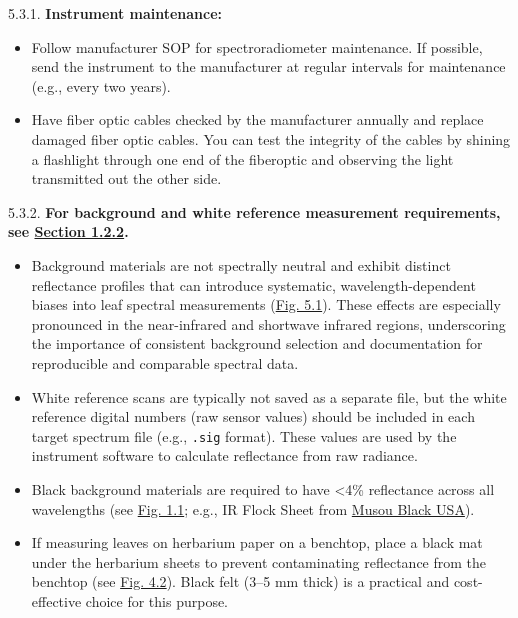 \documentclass[
  letterpaper,
  DIV=11,
  numbers=noendperiod]{scrreprt}
\providecommand{\tightlist}{%
  \setlength{\itemsep}{0pt}\setlength{\parskip}{0pt}}
\begin{document}
5.3.1. \textbf{Instrument maintenance:}

\begin{itemize}
\tightlist
\item
  Follow manufacturer SOP for spectroradiometer maintenance. If
  possible, send the instrument to the manufacturer at regular intervals
  for maintenance (e.g., every two years).\\
\item
  Have fiber optic cables checked by the manufacturer annually and
  replace damaged fiber optic cables. You can test the integrity of the
  cables by shining a flashlight through one end of the fiberoptic and
  observing the light transmitted out the other side.
\end{itemize}

5.3.2. \textbf{For background and white reference measurement
requirements, see
\hyperref[white-reference-and-background-measurements]{Section 1.2.2}.}

\begin{itemize}
\tightlist
\item
  Background materials are not spectrally neutral and exhibit distinct
  reflectance profiles that can introduce systematic,
  wavelength-dependent biases into leaf spectral measurements
  (\href{images/Fig-backgrounds_v2.jpg}{Fig. 5.1}). These effects are
  especially pronounced in the near-infrared and shortwave infrared
  regions, underscoring the importance of consistent background
  selection and documentation for reproducible and comparable spectral
  data.
\item
  White reference scans are typically not saved as a separate file, but
  the white reference digital numbers (raw sensor values) should be
  included in each target spectrum file (e.g., \texttt{.sig} format).
  These values are used by the instrument software to calculate
  reflectance from raw radiance.\\
\item
  Black background materials are required to have \textless4\%
  reflectance across all wavelengths (see \hyperref[f1-1]{Fig. 1.1};
  e.g., IR Flock Sheet from
  \href{https://musoublackusa.com/products/ir-flock-sheet}{Musou Black
  USA}).\\
\item
  If measuring leaves on herbarium paper on a benchtop, place a black
  mat under the herbarium sheets to prevent contaminating reflectance
  from the benchtop (see \hyperref[f4-2]{Fig. 4.2}). Black felt (3--5 mm
  thick) is a practical and cost-effective choice for this purpose.
\end{itemize}
\end{document}
